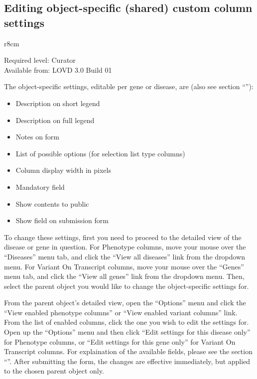 \subsection{Editing object-specific (shared) custom column settings}
\begin{wrapfigure}[3]{r}{8cm} %
  \vspace{-25pt}
  \begin{leftbar}
    Required level: Curator\\
    Available from: LOVD 3.0 Build 01
  \end{leftbar}
\end{wrapfigure}
The object-specific settings, editable per gene or disease, are (also see section
 ``''):
\tightlists
\begin{itemize}
  \item Description on short legend
  \item Description on full legend
  \item Notes on form
  \item List of possible options (for selection list type columns)
  \item Column display width in pixels
  \item Mandatory field
  \item Show contents to public
  \item Show field on submission form
\end{itemize}
\vspace{\baselineskip}
To change these settings, first you need to proceed to the detailed view of the disease or gene in question.
For Phenotype columns, move your mouse over the ``Diseases'' menu tab, and click the ``View all diseases'' link from the dropdown menu.
For Variant On Transcript columns, move your mouse over the ``Genes'' menu tab, and click the ``View all genes'' link from the dropdown menu.
Then, select the parent object you would like to change the object-specific settings for.

From the parent object's detailed view, open the ``Options'' menu and click the ``View enabled phenotype columns'' or ``View enabled variant columns'' link.
From the list of enabled columns, click the one you wish to edit the settings for.
Open up the ``Options'' menu and then click ``Edit settings for this disease only'' for Phenotype columns, or ``Edit settings for this gene only'' for Variant On Transcript columns.
For explaination of the available fields, please see the section ``''.
After submitting the form, the changes are effective immediately, but applied to the chosen parent object only.





